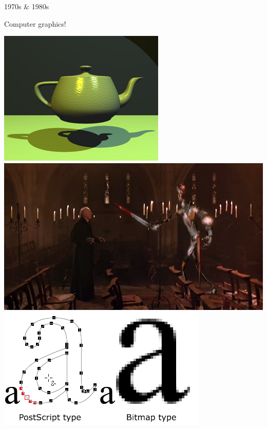 \documentclass{lug}
\begin{document}
\begin{frame}{1970s \& 1980s}
    \noindent
    \begin{minipage}{.65\textwidth}
        Computer graphics!
    \end{minipage}%
    \begin{minipage}{.35\textwidth}
        \includegraphics[width=\textwidth]{graphics/teapot_70s} \\
        \includegraphics[width=\textwidth]{graphics/ysh_knight} \\
        \includegraphics[width=\textwidth]{graphics/postscript_text}
    \end{minipage}
\end{frame}
\end{document}
